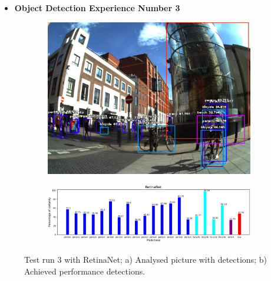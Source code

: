       \newpage

      \begin{itemize}
        \item \textbf{Object Detection Experience Number 3}
      \end{itemize}
    

      \begin{figure}[H]
        \centering
        \captionsetup{justification=centering}

        \begin{subfigure}{0.29\textwidth}
        \includegraphics[width=\textwidth]{Sections/4InitialWork/4_images_obj_run4/retinaNet.jpg} 
        \caption{}
        \end{subfigure}
        \begin{subfigure}{0.7\textwidth}
        \includegraphics[width=\textwidth]{Sections/4InitialWork/4_images_obj_run4/retinaNet_graph.png}
        \caption{}
        \end{subfigure}
        
        \caption[Test run 3 with RetinaNet]{ 
        Test run 3 with RetinaNet; a) Analysed picture with detections; b) Achieved performance detections. }
        \label{fig:retina_3}
        \end{figure}



